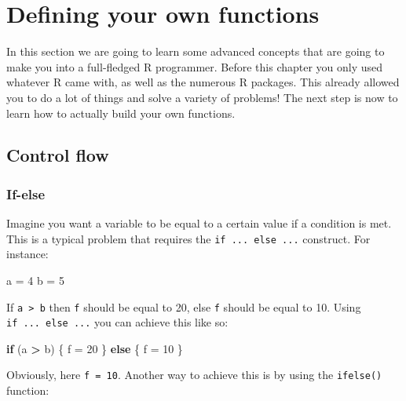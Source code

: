\documentclass[]{gitbook}
\newenvironment{Shaded}{\begin{snugshade}}{\end{snugshade}}
\newcommand{\ControlFlowTok}[1]{\textcolor[rgb]{0.13,0.29,0.53}{\textbf{#1}}}
\newcommand{\DecValTok}[1]{\textcolor[rgb]{0.00,0.00,0.81}{#1}}
\newcommand{\NormalTok}[1]{#1}
\newcommand{\OperatorTok}[1]{\textcolor[rgb]{0.81,0.36,0.00}{\textbf{#1}}}
\newcommand{\StringTok}[1]{\textcolor[rgb]{0.31,0.60,0.02}{#1}}
\theoremstyle{definition}
\theoremstyle{definition}
\theoremstyle{definition}
\theoremstyle{remark}
\begin{document}
\hypertarget{defining-your-own-functions}{%
\section{Defining your own
functions}\label{defining-your-own-functions}}

In this section we are going to learn some advanced concepts that are
going to make you into a full-fledged R programmer. Before this chapter
you only used whatever R came with, as well as the numerous R packages.
This already allowed you to do a lot of things and solve a variety of
problems! The next step is now to learn how to actually build your own
functions.

\hypertarget{control-flow}{%
\subsection{Control flow}\label{control-flow}}

\hypertarget{if-else}{%
\subsubsection{If-else}\label{if-else}}

Imagine you want a variable to be equal to a certain value if a
condition is met. This is a typical problem that requires the
\texttt{if\ ...\ else\ ...} construct. For instance:

\begin{Shaded}
\begin{Highlighting}[]
\NormalTok{a =}\StringTok{ }\DecValTok{4}
\NormalTok{b =}\StringTok{ }\DecValTok{5}
\end{Highlighting}
\end{Shaded}

If \texttt{a\ \textgreater{}\ b} then \texttt{f} should be equal to 20,
else \texttt{f} should be equal to 10. Using \texttt{if\ ...\ else\ ...}
you can achieve this like so:

\begin{Shaded}
\begin{Highlighting}[]
\ControlFlowTok{if}\NormalTok{ (a }\OperatorTok{>}\StringTok{ }\NormalTok{b) \{}
\NormalTok{  f =}\StringTok{ }\DecValTok{20}
\NormalTok{    \} }\ControlFlowTok{else}\NormalTok{ \{}
\NormalTok{  f =}\StringTok{ }\DecValTok{10}
\NormalTok{\}}
\end{Highlighting}
\end{Shaded}

Obviously, here \texttt{f\ =\ 10}. Another way to achieve this is by
using the \texttt{ifelse()} function:
\end{document}
